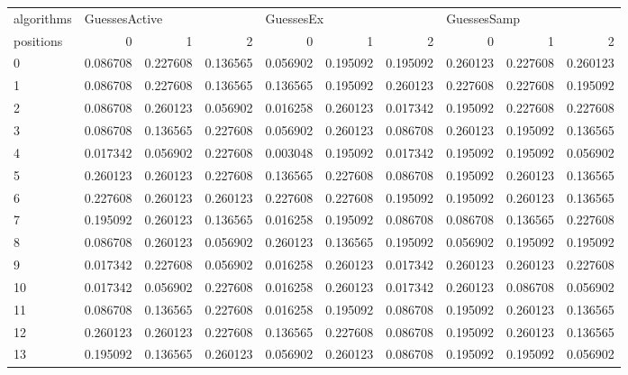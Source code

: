 \begin{table}
\begin{tabular}{lrrrrrrrrr}
\toprule
algorithms & \multicolumn{3}{l}{GuessesActive} & \multicolumn{3}{l}{GuessesEx} & \multicolumn{3}{l}{GuessesSamp} \\
positions &             0 &         1 &         2 &         0 &         1 &         2 &           0 &         1 &         2 \\
\midrule
0  &      0.086708 &  0.227608 &  0.136565 &  0.056902 &  0.195092 &  0.195092 &    0.260123 &  0.227608 &  0.260123 \\
1  &      0.086708 &  0.227608 &  0.136565 &  0.136565 &  0.195092 &  0.260123 &    0.227608 &  0.227608 &  0.195092 \\
2  &      0.086708 &  0.260123 &  0.056902 &  0.016258 &  0.260123 &  0.017342 &    0.195092 &  0.227608 &  0.227608 \\
3  &      0.086708 &  0.136565 &  0.227608 &  0.056902 &  0.260123 &  0.086708 &    0.260123 &  0.195092 &  0.136565 \\
4  &      0.017342 &  0.056902 &  0.227608 &  0.003048 &  0.195092 &  0.017342 &    0.195092 &  0.195092 &  0.056902 \\
5  &      0.260123 &  0.260123 &  0.227608 &  0.136565 &  0.227608 &  0.086708 &    0.195092 &  0.260123 &  0.136565 \\
6  &      0.227608 &  0.260123 &  0.260123 &  0.227608 &  0.227608 &  0.195092 &    0.195092 &  0.260123 &  0.136565 \\
7  &      0.195092 &  0.260123 &  0.136565 &  0.016258 &  0.195092 &  0.086708 &    0.086708 &  0.136565 &  0.227608 \\
8  &      0.086708 &  0.260123 &  0.056902 &  0.260123 &  0.136565 &  0.195092 &    0.056902 &  0.195092 &  0.195092 \\
9  &      0.017342 &  0.227608 &  0.056902 &  0.016258 &  0.260123 &  0.017342 &    0.260123 &  0.260123 &  0.227608 \\
10 &      0.017342 &  0.056902 &  0.227608 &  0.016258 &  0.260123 &  0.017342 &    0.260123 &  0.086708 &  0.056902 \\
11 &      0.086708 &  0.136565 &  0.227608 &  0.016258 &  0.195092 &  0.086708 &    0.195092 &  0.260123 &  0.136565 \\
12 &      0.260123 &  0.260123 &  0.227608 &  0.136565 &  0.227608 &  0.086708 &    0.195092 &  0.260123 &  0.136565 \\
13 &      0.195092 &  0.136565 &  0.260123 &  0.056902 &  0.260123 &  0.086708 &    0.195092 &  0.195092 &  0.056902 \\

\end{tabular}
\end{table}
